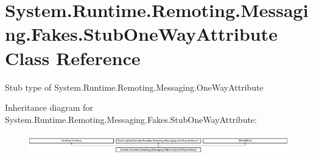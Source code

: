 \hypertarget{class_system_1_1_runtime_1_1_remoting_1_1_messaging_1_1_fakes_1_1_stub_one_way_attribute}{\section{System.\-Runtime.\-Remoting.\-Messaging.\-Fakes.\-Stub\-One\-Way\-Attribute Class Reference}
\label{class_system_1_1_runtime_1_1_remoting_1_1_messaging_1_1_fakes_1_1_stub_one_way_attribute}
}


Stub type of System.\-Runtime.\-Remoting.\-Messaging.\-One\-Way\-Attribute 


Inheritance diagram for System.\-Runtime.\-Remoting.\-Messaging.\-Fakes.\-Stub\-One\-Way\-Attribute\-:\begin{figure}[H]
\begin{center}
\leavevmode
\includegraphics[height=0.893142cm]{class_system_1_1_runtime_1_1_remoting_1_1_messaging_1_1_fakes_1_1_stub_one_way_attribute}
\end{center}
\end{figure}
